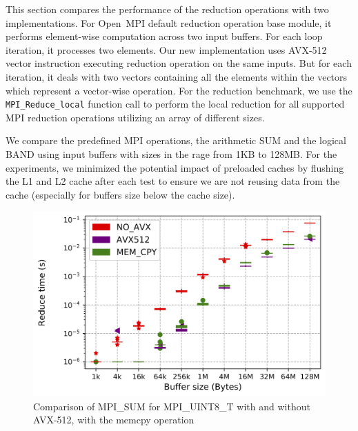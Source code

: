 \documentclass[5p,times,twocolumn]{elsarticle}
\newcommand{\mpifunc}[1]{\lstinline"MPI_#1"\xspace}
\newcommand{\ompi}[0]{Open~MPI\xspace}
\begin{document}
This section compares the performance of the reduction operations with two
implementations.
For \ompi default reduction operation base module, it
performs element-wise computation across two input buffers. For each loop iteration,
it processes two elements. Our new implementation uses AVX-512 vector instruction
executing reduction operation on the same inputs. But for each iteration, it
deals with two vectors containing all the elements within the vectors which represent
a vector-wise operation.
For the reduction benchmark, we use the \mpifunc{Reduce_local} function call to
perform the local reduction for all supported MPI reduction operations utilizing an array of different sizes.

We compare the predefined MPI operations, the arithmetic SUM and the logical BAND using input buffers with sizes in the rage from 1KB to 128MB.
For the experiments, we minimized the potential impact of preloaded caches by flushing the L1 and L2 cache after each test to ensure we are not reusing data from the cache (especially for buffers size below the cache size).

\begin{figure}[h]
    \centering
    \includegraphics[width=\linewidth]{avx_extend_more_sum_u8_1k-128M.png}
    \caption{Comparison of MPI\_SUM for MPI\_UINT8\_T with and without AVX-512, with the memcpy operation}
    \label{fig:avxsum}
\end{figure}
\end{document}
